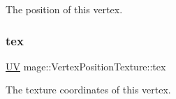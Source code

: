 The position of this vertex. \hypertarget{structmage_1_1_vertex_position_texture_a9b4efa25d268c812892ecffc2582496e}{}\label{structmage_1_1_vertex_position_texture_a9b4efa25d268c812892ecffc2582496e} 
\subsubsection{\texorpdfstring{tex}{tex}}
{\footnotesize\ttfamily \hyperlink{structmage_1_1_u_v}{UV} mage\+::\+Vertex\+Position\+Texture\+::tex}

The texture coordinates of this vertex. 